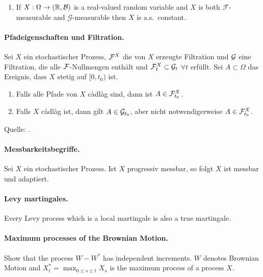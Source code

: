 \begin{enumerate} 
\item If $X: \Omega \to (\mathbb R, \mathcal B)$ is a
    real-valued random variable and $X$ is both $\mathcal F$-measurable
    and $\mathcal G$-measurable then $X$ is a.s.~constant.
\end{enumerate}



\paragraph{Pfadeigenschaften und Filtration. }  Sei $X$ ein stochastischer Prozess, $\mathcal F^{X}$
die von $X$ erzeugte Filtration und $\mathcal G$ eine Filtration, die alle
$\mathcal F$-Nullmengen enthält und $\mathcal F^{X}_t \subset \mathcal G_t$ $\forall t$ erfüllt.
Sei $A \subset \Omega$ das Ereignis, dass $X$ stetig auf $[0, t_0)$ ist. 
\begin{enumerate}
    \item Falls alle Pfade von $X$ c\`adl\`ag sind, dann ist $A \in \mathcal F^{X}_{t_0}$.
    \item Falls $X$ c\`adl\`ag ist, dann gilt $A \in \mathcal G_{t_0}$, aber nicht
        notwendigerweise $A \in \mathcal F^{X}_{t_0}$.
\end{enumerate}
Quelle: \cite{Karatzas1991}.





\paragraph{Messbarkeitsbegriffe. } Sei $X$ ein stochastischer Prozess. Ist $X$
progressiv messbar, so folgt $X$ ist messbar und adaptiert.



\paragraph{Levy martingales.} Every Levy process which is a local martingale is
also a true martingale.


\paragraph{Maximum processes of the Brownian Motion. } Show that the process $W
- W^*$ has independent increments. $W$ denotes Brownian Motion and $X^*_t=
\max_{0 \leq s \leq t} X_s$ is the maximum process of a \cadlag process $X$.





